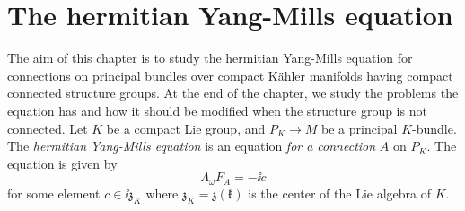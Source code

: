 \chapter{The hermitian Yang-Mills equation} \label{chapter_HYM_equation}
The aim of this chapter is to study the hermitian Yang-Mills equation for connections on principal bundles over compact Kähler manifolds having compact connected structure groups. At the end of the chapter, we study the problems the equation has and how it should be modified when the structure group is not connected. Let \(K\) be a compact Lie group, and \(P_K \to M\) be a principal \(K\)-bundle. The \textit{hermitian Yang-Mills equation} is an equation \textit{for a connection} \(A\) on \(P_K\). The equation is given by 
\begin{equation} \label{eq_HYM_ch_HYM}
\Lambda_\omega F_A=-\ii c
\end{equation}
for some element \(c \in \ii\mathfrak{z}_K\) where \(\mathfrak{z}_K=\mathfrak{z}(\mathfrak{k})\) is the center of the Lie algebra of \(K\). 

